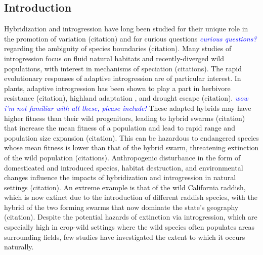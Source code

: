 \documentclass[11pt]{article} %
\newcommand{\jri}[1]{\textcolor{blue}{ \emph{\scriptsize  #1}} } %
\begin{document}
\begin{linenumbers}
	\renewcommand\linenumberfont{\normalfont\bfseries\small}

\section*{Introduction}
Hybridization and introgression have long been studied for their unique role in the promotion of variation (citation) and for curious questions \jri{curious questions?} regarding the ambiguity of species boundaries (citation). 
Many studies of introgression focus on fluid natural habitats and recently-diverged wild populations, with interest in mechanisms of speciation (citations).  
The rapid evolutionary responses of adaptive introgression are of particular interest.  
In plants, adaptive introgression has been shown to play a part in herbivore resistance (citation), highland adaptation \citep{hufford2013}, and drought escape (citation).  \jri{wow i'm not familiar with all these, please include!}
These adapted hybrids may have higher fitness than their wild progenitors, leading to hybrid swarms (citation) that increase the mean fitness of a population and lead to rapid range and population size expansion (citation).  
This can be hazardous to endangered species whose mean fitness is lower than that of the hybrid swarm, threatening extinction of the wild population (citations).  
Anthropogenic disturbance in the form of domesticated and introduced species, habitat destruction, and environmental changes influence the impacts of hybridization and introgression in natural settings (citation).  
An extreme example is that of the wild California raddish, which is now extinct due to the introduction of different raddish species, with the hybrid of the two forming swarms that now dominate the state’s geography (citation). 
Despite the potential hazards of extinction via introgression, which are especially high in crop-wild settings where the wild species often populates areas surrounding fields, few studies have investigated the extent to which it occurs naturally. 


\end{linenumbers}
\end{document}
